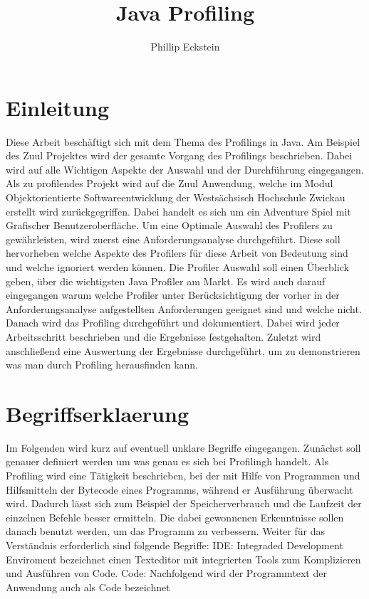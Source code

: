 \documentclass{article}
\author{Phillip Eckstein}
\title{Java Profiling}
\begin{document}
    
\maketitle
\tableofcontents

\pagebreak

\section{Einleitung}
Diese Arbeit beschäftigt sich mit dem Thema des Profilings in Java. Am Beispiel des Zuul Projektes wird der gesamte Vorgang des Profilings beschrieben. Dabei wird auf alle Wichtigen Aspekte der Auswahl und der Durchführung eingegangen. Als zu profilendes Projekt wird auf die Zuul Anwendung, welche im Modul Objektorientierte Softwareentwicklung der Westsächsisch Hochschule Zwickau erstellt wird zurückgegriffen. Dabei handelt es sich um ein Adventure Spiel mit Grafischer Benutzeroberfläche. Um eine Optimale Auswahl des Profilers zu gewährleisten, wird zuerst eine Anforderungsanalyse durchgeführt. Diese soll hervorheben welche Aspekte des Profilers für diese Arbeit von Bedeutung sind und welche ignoriert werden können. Die Profiler Auswahl soll einen Überblick geben, über die wichtigsten Java Profiler am Markt. Es wird auch darauf eingegangen warum welche Profiler unter Berücksichtigung der vorher in der Anforderungsanalyse aufgestellten Anforderungen geeignet sind und welche nicht. Danach wird das Profiling durchgeführt und dokumentiert. Dabei wird jeder Arbeitsschritt beschrieben und die Ergebnisse festgehalten. Zuletzt wird anschließend eine Auswertung der Ergebnisse durchgeführt, um zu demonstrieren was man durch Profiling herausfinden kann.


\section{Begriffserklaerung}

Im Folgenden wird kurz auf eventuell unklare Begriffe eingegangen. Zunächst soll genauer definiert werden um was genau es sich bei Profilingh handelt. Als Profiling wird eine Tätigkeit beschrieben, bei der mit Hilfe von Programmen und Hilfsmitteln der Bytecode eines Programms, während er Ausführung überwacht wird. Dadurch lässt sich zum Beispiel der Speicherverbrauch und die Laufzeit der einzelnen Befehle besser ermitteln. Die dabei gewonnenen Erkenntnisse sollen danach benutzt werden, um das Programm zu verbessern. Weiter für das Verständnis erforderlich sind folgende Begriffe:
IDE: Integraded Development Enviroment bezeichnet einen Texteditor mit integrierten Tools zum Komplizieren und Ausführen von Code.
Code: Nachfolgend wird der Programmtext der Anwendung auch als Code bezeichnet
\end{document}
